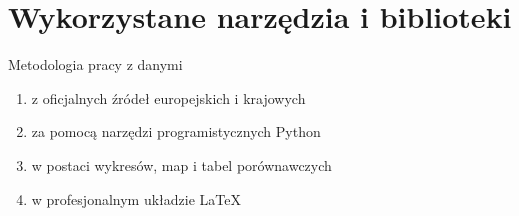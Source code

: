 \section{Wykorzystane narzędzia i biblioteki}

\begin{frame}{Metodologia pracy z danymi}
    \begin{enumerate}
        \item {} z oficjalnych źródeł europejskich i krajowych
        \vspace{0.3em}
        
        \item {} za pomocą narzędzi programistycznych Python
        \vspace{0.3em}
        
        \item {} w postaci wykresów, map i tabel porównawczych
        \vspace{0.3em}
        
        \item {} w profesjonalnym układzie LaTeX
    \end{enumerate}
\end{frame}

